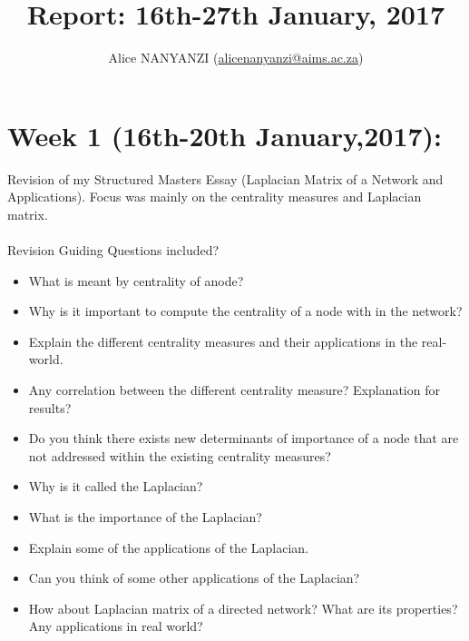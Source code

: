 \documentclass[10pt,a4paper]{article}
\author{Alice NANYANZI (\href{mailto:alicenanyanzi@aims.ac.za}{alicenanyanzi@aims.ac.za})}
\title{Report: 16th-27th January, 2017}
\begin{document}
\maketitle
\section*{Week 1 (16th-20th January,2017):}
Revision of my Structured Masters Essay (Laplacian Matrix of a Network and Applications). Focus was mainly on the centrality measures and Laplacian matrix.\\\\
Revision Guiding Questions included?
\begin{itemize}
\item What is meant by centrality of anode?
\item Why is it important to compute the centrality of a node with in the network?
\item Explain the different centrality measures and their applications in the real-world.
\item Any correlation between the different centrality measure? Explanation for results?
\item Do you think there exists new determinants of importance of a node that are not addressed within the existing centrality measures?
\item Why is it called the Laplacian?
\item What is the importance of the Laplacian?
\item Explain some of the applications of the Laplacian.
\item Can you think of some other applications of the Laplacian?
\item How about Laplacian matrix of a directed network? What are its properties? Any applications in real world?
\end{itemize}
\end{document}
